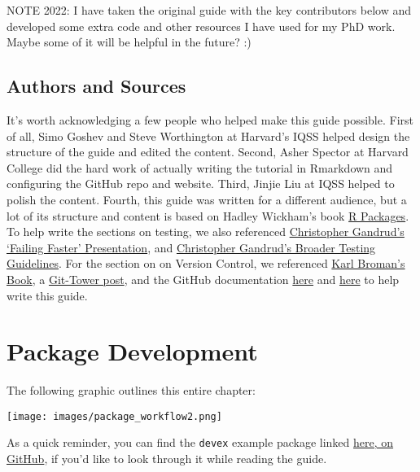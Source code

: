 \documentclass[
]{book}
\begin{document}
NOTE 2022: I have taken the original guide with the key contributors below and developed some extra code and other resources I have used for my PhD work. Maybe some of it will be helpful in the future? :)

\hypertarget{authors-and-sources}{%
\section*{Authors and Sources}\label{authors-and-sources}}

It's worth acknowledging a few people who helped make this guide possible. First of all, Simo Goshev and Steve Worthington at Harvard's IQSS helped design the structure of the guide and edited the content. Second, Asher Spector at Harvard College did the hard work of actually writing the tutorial in Rmarkdown and configuring the GitHub repo and website. Third, Jinjie Liu at IQSS helped to polish the content. Fourth, this guide was written for a different audience, but a lot of its structure and content is based on Hadley Wickham's book \href{http://r-pkgs.had.co.nz/}{R Packages}. To help write the sections on testing, we also referenced \href{http://slides.com/christophergandrud/failing-faster\#/24}{Christopher Gandrud's `Failing Faster' Presentation}, and \href{https://github.com/IQSS/social_science_software_toolkit/blob/master/testing/recommended_testing_tools_R.md\#recommended-testing-tools-and-process-for-r-packages}{Christopher Gandrud's Broader Testing Guidelines}. For the section on on Version Control, we referenced \href{https://kbroman.org/github_tutorial/}{Karl Broman's Book}, a \href{https://www.git-tower.com/learn/git/faq/restore-repo-to-previous-revision}{Git-Tower post}, and the GitHub documentation \href{https://git-scm.com/book/en/v2/Getting-Started-Git-Basics}{here} and \href{https://git-scm.com/book/en/v2/Getting-Started-First-Time-Git-Setup}{here} to help write this guide.

\hypertarget{package-development}{%
\chapter{Package Development}\label{package-development}}

The following graphic outlines this entire chapter:

\texttt{[image: images/package\_workflow2.png]}

As a quick reminder, you can find the \texttt{devex} example package linked \href{https://github.com/IQSS/Rbuild/tree/master/devex}{here, on GitHub}, if you'd like to look through it while reading the guide.
\end{document}
